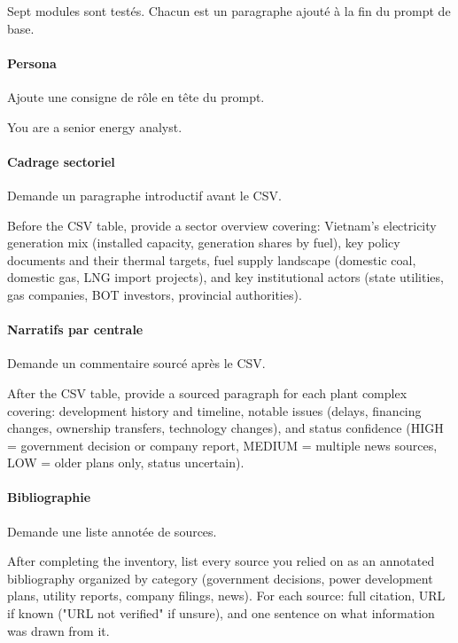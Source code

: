 Sept modules sont testés. Chacun est un paragraphe ajouté à la fin du prompt
de base.

\paragraph{Persona} Ajoute une consigne de rôle en tête du prompt.
\label{prompt:mod-persona}%
\begin{Prompt}
You are a senior energy analyst.
\end{Prompt}

\paragraph{Cadrage sectoriel} Demande un paragraphe introductif avant le CSV.
\label{prompt:mod-overview}%
\begin{Prompt}
Before the CSV table, provide a sector overview covering: Vietnam's
electricity generation mix (installed capacity, generation shares by
fuel), key policy documents and their thermal targets, fuel supply
landscape (domestic coal, domestic gas, LNG import projects), and key
institutional actors (state utilities, gas companies, BOT investors,
provincial authorities).
\end{Prompt}

\paragraph{Narratifs par centrale} Demande un commentaire sourcé après le CSV.
\label{prompt:mod-narratives}%
\begin{Prompt}
After the CSV table, provide a sourced paragraph for each plant complex
covering: development history and timeline, notable issues (delays,
financing changes, ownership transfers, technology changes), and status
confidence (HIGH = government decision or company report, MEDIUM =
multiple news sources, LOW = older plans only, status uncertain).
\end{Prompt}

\paragraph{Bibliographie} Demande une liste annotée de sources.
\label{prompt:mod-bibliography}%
\begin{Prompt}
After completing the inventory, list every source you relied on as an
annotated bibliography organized by category (government decisions,
power development plans, utility reports, company filings, news). For
each source: full citation, URL if known ("URL not verified" if
unsure), and one sentence on what information was drawn from it.
\end{Prompt}

